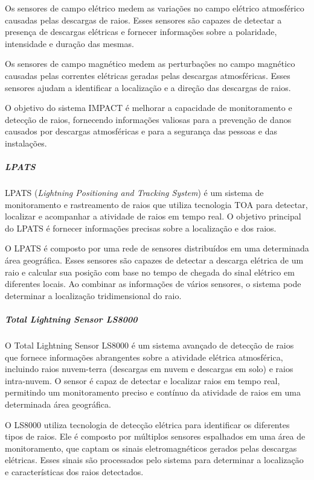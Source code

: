 \documentclass[a4paper, 12pt, onecolumn,singlespacing]{article}
\begin{document}
	Os sensores de campo elétrico medem as variações no campo elétrico atmosférico causadas pelas descargas de raios. Esses sensores são capazes de detectar a presença de descargas elétricas e fornecer informações sobre a polaridade, intensidade e duração das mesmas.
	
	Os sensores de campo magnético medem as perturbações no campo magnético causadas pelas correntes elétricas geradas pelas descargas atmosféricas. Esses sensores ajudam a identificar a localização e a direção das descargas de raios.
	
	O objetivo do sistema IMPACT é melhorar a capacidade de monitoramento e detecção de raios, fornecendo informações valiosas para a prevenção de danos causados por descargas atmosféricas e para a segurança das pessoas e das instalações.
	
	\subparagraph{LPATS}
	
	LPATS (\textit{Lightning Positioning and Tracking System}) é um sistema de monitoramento e rastreamento de raios que utiliza tecnologia TOA para detectar, localizar e acompanhar a atividade de raios em tempo real. O objetivo principal do LPATS é fornecer informações precisas sobre a localização e dos raios.
	
	O LPATS é composto por uma rede de sensores distribuídos em uma determinada área geográfica. Esses sensores são capazes de detectar a descarga elétrica de um raio e calcular sua posição com base no tempo de chegada do sinal elétrico em diferentes locais. Ao combinar as informações de vários sensores, o sistema pode determinar a localização tridimensional do raio.
	
	\subparagraph{Total Lightning Sensor LS8000}
	
	O Total Lightning Sensor LS8000 é um sistema avançado de detecção de raios que fornece informações abrangentes sobre a atividade elétrica atmosférica, incluindo raios nuvem-terra (descargas em nuvem e descargas em solo) e raios intra-nuvem. O sensor é capaz de detectar e localizar raios em tempo real, permitindo um monitoramento preciso e contínuo da atividade de raios em uma determinada área geográfica.
	
	O LS8000 utiliza tecnologia de detecção elétrica para identificar os diferentes tipos de raios. Ele é composto por múltiplos sensores espalhados em uma área de monitoramento, que captam os sinais eletromagnéticos gerados pelas descargas elétricas. Esses sinais são processados pelo sistema para determinar a localização e características dos raios detectados.
	
\end{document}
